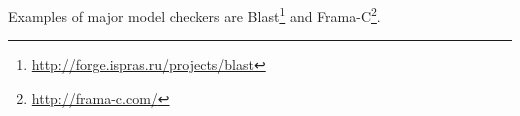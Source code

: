   


Examples of major model checkers are Blast\footnote{\url{http://forge.ispras.ru/projects/blast}} and Frama-C\footnote{\url{http://frama-c.com/}}.

